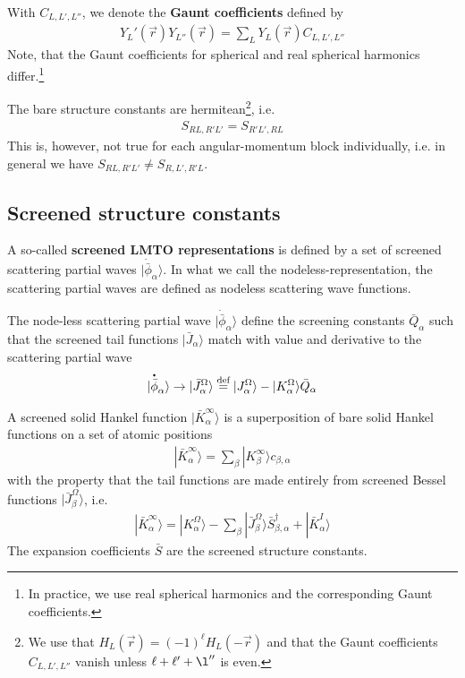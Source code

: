 \documentclass[11pt,a4paper]{report}
\begin{document}
With $C_{L,L',L''}$, we denote the \textbf{Gaunt
  coefficients} defined by
\begin{eqnarray}
Y_L'(\vec{r})Y_{L''}(\vec{r})=\sum_L Y_{L}(\vec{r})C_{L,L',L''}
\end{eqnarray}
Note, that the Gaunt coefficients for spherical and real spherical
harmonics differ.\footnote{In practice, we use real spherical
  harmonics and the corresponding Gaunt coefficients.}

The bare structure constants are hermitean\footnote{We use that
  $H_L(\vec{r})=(-1)^\ell H_L(-\vec{r})$ and that the Gaunt
  coefficients $C_{L,L',L''}$ vanish unless $\ell+\ell'+\l''$ is
  even.}, i.e.
\begin{eqnarray}
S_{RL,R'L'}=S_{R'L',RL}
\end{eqnarray}
This is, however, not true for each angular-momentum block individually,
i.e. in general we have $S_{RL,R'L'}\neq S_{R,L',R'L}$.

\subsection{Screened structure constants}
A so-called \textbf{screened LMTO representations} is defined by a set of screened scattering partial waves
$|\dot{\bar{\phi}}_\alpha\rangle$.  In what we call the
nodeless-representation, the scattering partial waves are defined as
nodeless scattering wave functions.


The node-less scattering partial wave
$|\dot{\bar{\phi}}_\alpha\rangle$ define the screening constants
$\bar{Q}_{\alpha}$ such that the screened tail functions
$|\bar{J}_\alpha\rangle$ match with value and derivative to the
scattering partial wave
\begin{eqnarray}
|\overset{\mbox{\large\bfseries .}}{\bar{\phi}}_\alpha\rangle \rightarrow 
|\bar{J}^{\Omega}_{\alpha}\rangle
\stackrel{\text{def}}{=}
|J^{\Omega}_{\alpha}\rangle
-|K^{\Omega}_{\alpha}\rangle \bar{Q}_{\alpha}
\end{eqnarray}

A screened solid Hankel function $|\bar{K}_{\alpha}^\infty\rangle$ is
a superposition of bare solid Hankel functions on a set of atomic
positions
\begin{eqnarray}
|\bar{K}^\infty_\alpha\rangle=\sum_\beta|K^\infty_\beta\rangle c_{\beta,\alpha}
\label{eq:kbarassuperposofkbare}
\end{eqnarray}
with the property that the tail functions are made entirely
from screened Bessel functions $|\bar{J}^\Omega_{\beta}\rangle$, i.e.
\begin{eqnarray}
|\bar{K}_{\alpha}^\infty\rangle=|K^\Omega_{\alpha}\rangle
-\sum_{\beta}|\bar{J}^\Omega_{\beta}\rangle \bar{S}^\dagger_{\beta,\alpha}
+|\bar{K}^I_{\alpha}\rangle
\label{eq:kbarwithsbar}
\end{eqnarray}
The expansion coefficients $\bar{S}$ are the screened structure
constants.
\end{document}
